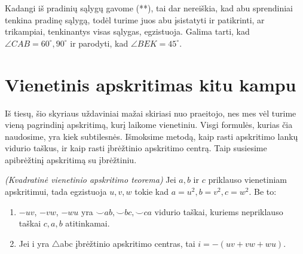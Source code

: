 \documentclass[11pt,a4paper,twoside]{book}
\begin{document}
\begin{sprendimas}
Kadangi iš pradinių sąlygų gavome (**), tai dar nereiškia, kad abu sprendiniai tenkina pradinę sąlygą, todėl turime juos abu įsistatyti ir patikrinti, ar trikampiai, tenkinantys visas sąlygas, egzistuoja. Galima tarti, kad $\angle CAB= 60^{\circ},90^{\circ}$ ir parodyti, kad $\angle BEK =45^{\circ}$.
\end{sprendimas}





















\section{Vienetinis apskritimas kitu kampu}

Iš tiesų, šio skyriaus uždaviniai mažai skiriasi nuo praeitojo, nes mes vėl turime vieną pagrindinį apskritimą, kurį laikome vienetiniu. Visgi formulės, kurias čia naudosime, yra kiek subtilesnės. Išmoksime metodą, kaip rasti apskritimo lankų vidurio taškus, ir kaip rasti įbrėžtinio apskritimo centrą. Taip susiesime apibrėžtinį apskritimą su įbrėžtiniu.

\begin{thmnr} \textit{(Kvadratinė vienetinio apskritimo teorema)} Jei $a, b$ ir $c$ priklauso vienetiniam apskritimui, tada egzistuoja $u, v, w$ tokie kad $a=u^2, b=v^2, c=w^2$. Be to:\
\begin{enumerate}
\item $-uv$, $-vw$, $-wu$ yra $\smile ab, \smile bc, \smile ca$ vidurio taškai, kuriems nepriklauso taškai $c, a, b$ atitinkamai.
\item Jei i yra $\bigtriangleup$abc įbrėžtinio apskritimo centras, tai $i= - (uv + vw + wu)$.
\end{enumerate}
\end{thmnr}
\end{document}

